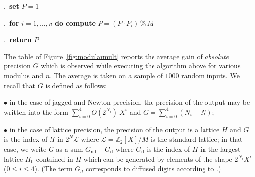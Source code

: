 \documentclass{sig-alternate-05-2015}
\newcommand{\Z}{\mathbb Z}
\renewcommand{\mod}{\,\%\,}
\begin{document}
.\ {\bf set} $P = 1$

.\ {\bf for} $i=1,\dots,n$ {\bf do} {\bf compute} $P = (P 
\cdot P_i) \mod M$

.\ {\bf return} $P$

\vspace{-1ex}\noindent\hrulefill

\medskip

The table of Figure~\ref{fig:modularmult} reports the average gain of 
\emph{absolute} precision $G$ which is observed while executing the 
algorithm above for various modulus and $n$. The average is taken on a 
sample of $1000$ random inputs. We recall that $G$ is defined as 
follows:

\noindent $\bullet$
in the case of jagged and Newton precision, the precision of the output 
may be written into the form $\sum_{i=0}^4 O(2^{N_i}) \: X^i$ and 
$G = \sum_{i=0}^4 (N_i - N)$;

\noindent $\bullet$
in the case of lattice precision, the precision of the output is a 
lattice $H$ and $G$ is the index of $H$ in $2^N \mathcal L$ where 
$\mathcal L = \Z_2[X]/M$ is the standard lattice; in that case, we write 
$G$ as a sum $G_{\text{nd}} + G_{\text{d}}$ where $G_{\text{d}}$ is the 
index of $H$ in the largest lattice $H_0$ contained in $H$ which can be 
generated by elements of the shape $2^{N_i} X^i$ ($0 \leq i \leq 4$). 
(The term $G_d$ corresponds to diffused digits according to 
\cite[Definition~2.3]{caruso-roe-vaccon:15a}.)
\end{document}
